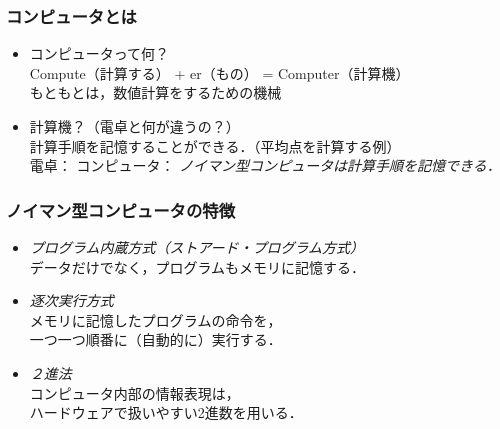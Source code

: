 \documentclass[handout]{beamer}        %
\begin{document}
\begin{frame}
  \frametitle{コンピュータとは}
  \begin{itemize}
  \item コンピュータって何？\\
    Compute（計算する） + er（もの） = Computer（計算機）\\
    もともとは，数値計算をするための機械
    \vfill
  \item 計算機？（電卓と何が違うの？） \\
    計算手順を記憶することができる．（平均点を計算する例）\\
    \vfill
    電卓：
    \vfill
    コンピュータ：
    \vfill
    \emph{ノイマン型コンピュータは計算手順を記憶できる．}
  \end{itemize}
\end{frame}

\begin{frame}
  \frametitle{ノイマン型コンピュータの特徴}
  \begin{itemize}
  \item \emph{プログラム内蔵方式（ストアード・プログラム方式）} \\
    データだけでなく，プログラムもメモリに記憶する．
    \vfill
  \item \emph{逐次実行方式} \\
    メモリに記憶したプログラムの命令を，\\
    一つ一つ順番に（自動的に）実行する．
    \vfill
  \item \emph{２進法} \\
    コンピュータ内部の情報表現は，\\
    ハードウェアで扱いやすい2進数を用いる．
    \vfill
  \end{itemize}
\end{frame}
\end{document}
